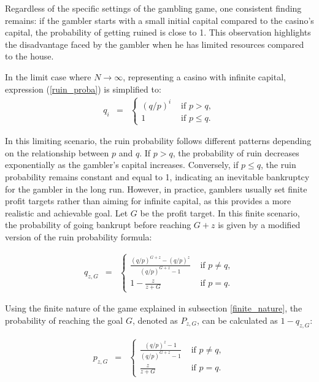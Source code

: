 \documentclass[11pt,twoside]{article}
\numberwithin{Theorem}{section}
\numberwithin{Definition}{section}
\numberwithin{Lemma}{section}
\numberwithin{Algorithm}{section}
\numberwithin{equation}{section}
\begin{document}
Regardless of the specific settings of the gambling game, one consistent finding remains: if the gambler starts with a small initial capital compared to the casino's capital, the probability of getting ruined is close to 1. This observation highlights the disadvantage faced by the gambler when he has limited resources compared to the house.

In the limit case where $N \rightarrow \infty$, representing a casino with infinite capital, expression (\ref{ruin_proba}) is simplified to:
\begin{eqnarray}\label{limit_case}
q_{i}&=& \left\{
\begin{array}{ll}
(q/p)^{i} & \text{ if } p > q,\\
1 & \text{ if } p\leq q.
\end{array}
\right.
\end{eqnarray}

In this limiting scenario, the ruin probability follows different patterns depending on the relationship between $p$ and $q$. If $p > q$, the probability of ruin decreases exponentially as the gambler's capital increases. Conversely, if $p \leq q$, the ruin probability remains constant and equal to 1, indicating an inevitable bankruptcy for the gambler in the long run. However, in practice, gamblers usually set finite profit targets rather than aiming for infinite capital, as this provides a more realistic and achievable goal. Let $G$ be the profit target. In this finite scenario, the probability of going bankrupt before reaching $G+z$ is given by a modified version of the ruin probability formula:

\begin{eqnarray}
q_{z, G}&=& \left\{
\begin{array}{ll}
\frac{(q/p)^{G+z} -(q/p)^{z} }{(q/p)^{G+z} -1} & \text{ if } p\neq q,\\
1 -\frac{z}{z+G}& \text{ if } p= q. \label{gral_ruin_proba}
\end{array}
\right.
\end{eqnarray}

Using the finite nature of the game explained in subsection \ref{finite_nature}, the probability of reaching the goal $G$, denoted as $P_{z,G}$, can be calculated as $1-q_{z,G}$:

\begin{eqnarray}
p_{z, G}&=& \left\{
\begin{array}{ll}
\frac{(q/p)^{z} -1}{(q/p)^{G+z} -1} & \text{ if } p\neq q,\\
\frac{z}{z+G}& \text{ if } p= q. \label{reach_proba}
\end{array}
\right.
\end{eqnarray}
\end{document}
